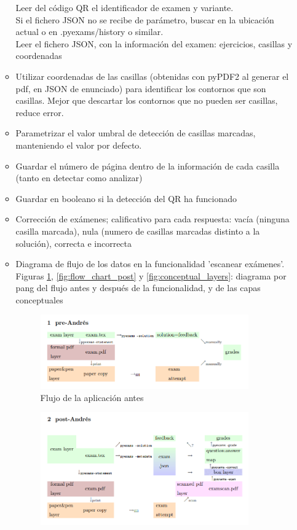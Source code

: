 \begin{itemize}
\begin{itemize}
\begin{itemize}
        \end{itemize}
        Leer del código QR el identificador de examen y variante.\\
        Si el fichero JSON no se recibe de parámetro, buscar en la ubicación actual o en .pyexams/history o similar.\\
        Leer el fichero JSON, con la información del examen: ejercicios, casillas y coordenadas
        \item Utilizar coordenadas de las casillas (obtenidas con pyPDF2 al generar el pdf, en JSON de enunciado) para identificar los contornos que son casillas. Mejor que descartar los contornos que no pueden ser casillas, reduce error.
        \item Parametrizar el valor umbral de detección de casillas marcadas, manteniendo el valor por defecto.
        \item Guardar el número de página dentro de la información de cada casilla (tanto en detectar como analizar)
        \item Guardar en booleano si la detección del QR ha funcionado
        \item Corrección de exámenes; calificativo para cada respuesta: vacía (ninguna casilla marcada), nula (numero de casillas marcadas distinto a la solución), correcta e incorrecta
        \item Diagrama de flujo de los datos en la funcionalidad 'escanear exámenes'. Figuras \ref{fig:flow_chart_prev}, \ref{fig:flow_chart_post} y \ref{fig:conceptual_layers}: diagrama por pang del flujo antes y después de la funcionalidad, y de las capas conceptuales
        \begin{figure}
                \centering
                \includegraphics[width=0.9\textwidth]{figures/flow_chart_prev.png}
                \caption{Flujo de la aplicación antes}
                \label{fig:flow_chart_prev}
        \end{figure}
        \begin{figure}
                \centering
                \includegraphics[width=0.9\textwidth]{figures/flow_chart_post.png}

\end{figure}
\end{itemize}
\end{itemize}

